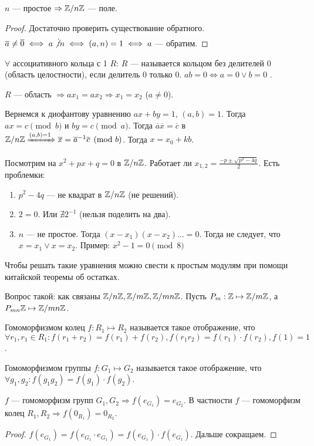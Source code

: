 \begin{consequence}
    $n$ --- простое  $\Rightarrow \mathbb{Z} / n\mathbb{Z}$ --- поле.
\end{consequence}
\begin{proof}
    Достаточно проверить существование обратного. $\overline{a} \neq \overline{0} \iff a \not\vdots n \iff (a, n) = 1 \iff a$ --- обратим.
\end{proof}
\begin{definition}
    $\forall $ ассоциативного кольца с 1 $R$:  $R$ --- называется кольцом без делителей 0 (область целостности), если делитель 0 только 0.  $ab = 0 \iff a = 0 \lor b = 0$  .
\end{definition}
 \begin{remark}
     $R$ --- область  $\Rightarrow ax_1=ax_2 \Rightarrow x_1=x_2$ ($a \neq 0$).
\end{remark}
\slashn
Вернемся к диофантову уравнению $ax+by=1$, $(a, b) = 1$. Тогда $ax = c \pmod{b}$ и  $by = c \pmod{a}$. Тогда  $\overline{a}\overline{x}=\overline{c}$ в  $\mathbb{Z} / n\mathbb{Z} \xRightarrow{(a,b)=1} \overline{x} = \overline{a}^{-1}\overline{c} \pmod{b}$. Тогда $x = x_0+kb$.

Посмотрим на $x^2+px+q=0$ в  $\mathbb{Z} / n\mathbb{Z}$. Работает ли  $x_{1,2} = \frac{-p \pm \sqrt{p^2 - 4q}}{2}$. Есть проблемки:
 \begin{enumerate}
     \item $p^2 - 4q$ --- не квадрат в  $\mathbb{Z} / n\mathbb{Z}$ (не решений).
     \item $2 = 0$. Или  $\nexists 2^{-1}$ (нельзя поделить на два).
     \item  $n$ --- не простое. Тогда  $(x-x_1)(x-x_2)\ldots=0$. Тогда не следует, что $x = x_1 \lor x = x_2$. Пример: $x^2-1=0 \pmod{8}$
\end{enumerate}
Чтобы решать такие уравнения можно свести к простым модулям при помощи китайской теоремы об остатках.

Вопрос такой: как связаны $\mathbb{Z} / n\mathbb{Z}, \mathbb{Z} / m\mathbb{Z}, \mathbb{Z} / mn\mathbb{Z}$. Пусть $P_m: \mathbb{Z} \mapsto \mathbb{Z} / m\mathbb{Z}$, а $P_{mn} \mathbb{Z} \mapsto \mathbb{Z} / mn\mathbb{Z}$. 

 \begin{definition}
     Гомоморфизмом колец $f: R_1 \mapsto R_2$ называется такое отображение, что $\forall r_1, r_1 \in R_1: f(r_1 + r_2) = f(r_1) + f(r_2), f(r_1r_2)=f(r_1)\cdot f(r_2), f(1) = 1$.
\end{definition}
\begin{definition}
    Гомоморфизмом группы $f: G_1 \mapsto G_2$ называется такое отображение, что $\forall g_1, g_2: f(g_1g_2) = f(g_1) \cdot f(g_2)$.
\end{definition}
\begin{remark}
    $f$ --- гомоморфизм групп  $G_1, G_2 \Rightarrow f(e_{G_1}) = e_{G_2}$.  В частности  $f$ --- гомоморфизм колец  $R_1,R_2 \Rightarrow f(0_{R_1}) = 0_{R_2}$.
\end{remark}
\begin{proof}
    $f(e_{G_1}) = f(e_{G_1} \cdot e_{G_1}) = f(e_{G_1}) \cdot f(e_{G_1})$. Дальше сокращаем.
\end{proof}
\slashn

